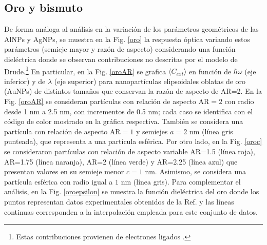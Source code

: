 \subsection*{Oro y bismuto}
De forma análoga al análisis en la variación de los parámetros geométricos de las AlNPs y AgNPs, se muestra en la Fig. \ref{oro} la respuesta óptica variando estos parámetros (semieje mayor y razón de aspecto) considerando una función dieléctrica donde se observan contribuciones no descritas por el modelo de Drude.\footnote{Estas contribuciones provienen de electrones ligados \cite{Plasmonics}.} En particular, en la Fig. \ref{oroAR} se grafica $\langle C_{ext}\rangle$ en función de $\hbar\omega$ (eje inferior) y de $\lambda$ (eje superior) para nanopartículas elipsoidales oblatas de oro (AuNPs) de distintos tamaños que conservan la razón de aspecto de AR=2.  En la Fig. \ref{oroAR} se consideran partículas con relación de aspecto AR$=2$ con radio desde 1  nm a 2.5 nm, con incrementos de 0.5 nm; cada caso se identifica con el código de color mostrado en la gráfica respectiva. También se considera una partícula con relación de aspecto AR$=1$ y semiejes $a=2$ nm (línea gris punteada), que representa a una partícula esférica. Por otro lado, en la Fig. \ref{oroc} se consideraron partículas con relación de aspecto variable AR=1.5 (línea roja), AR=1.75 (línea naranja), AR=2 (línea verde) y AR=2.25 (línea azul) que presentan valores en su semieje menor $c=1\text{ nm}$. Asimismo, se considera una partícula esférica con radio igual a $1\text{ nm}$ (línea gris). Para complementar el análisis, en la Fig. \ref{oroepsilon} se muestra la función dieléctrica del oro donde los puntos representan datos experimentales obtenidos de la Ref. \cite{Plata} y las líneas continuas corresponden a la interpolación empleada para este conjunto de datos.\\


